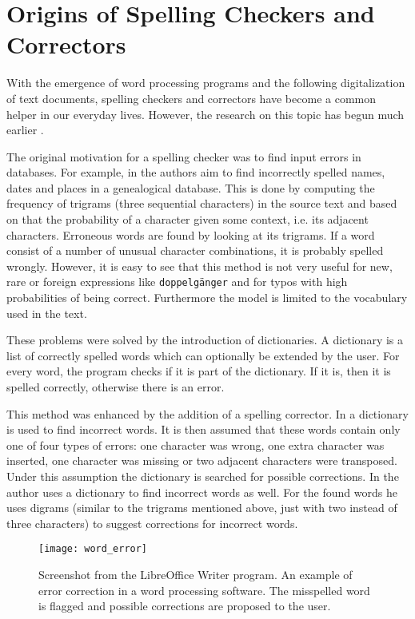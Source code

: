 \section{Origins of Spelling Checkers and Correctors}

With the emergence of word processing programs and the following digitalization of text documents, spelling checkers and correctors have become a common helper in our everyday lives. However, the research on this topic has begun much earlier \cite{program_check_correction}.

The original motivation for a spelling checker was to find input errors in databases. For example, in \cite{data_correction} the authors aim to find incorrectly spelled names, dates and places in a genealogical database. This is done by computing the frequency of trigrams (three sequential characters) in the source text and based on that the probability of a character given some context, i.e. its adjacent characters. Erroneous words are found by looking at its trigrams. If a word consist of a number of unusual character combinations, it is probably spelled wrongly. However, it is easy to see that this method is not very useful for new, rare or foreign expressions like \texttt{doppelg\"{a}nger} and for typos with high probabilities of being correct. Furthermore the model is limited to the vocabulary used in the text.

These problems were solved by the introduction of dictionaries. A dictionary is a list of correctly spelled words which can optionally be extended by the user. For every word, the program checks if it is part of the dictionary. If it is, then it is spelled correctly, otherwise there is an error.

This method was enhanced by the addition of a spelling corrector. In \cite{dictionary_correction} a dictionary is used to find incorrect words. It is then assumed that these words contain only one of four types of errors: one character was wrong, one extra character was inserted, one character was missing or two adjacent characters were transposed. Under this assumption the dictionary is searched for possible corrections. In \cite{digram_correction} the author uses a dictionary to find incorrect words as well. For the found words he uses digrams (similar to the trigrams mentioned above, just with two instead of three characters) to suggest corrections for incorrect words.

\begin{figure}[t]
\centering
\texttt{[image: word\_error]}
\caption{Screenshot from the LibreOffice Writer program. An example of error correction in a word processing software. The misspelled word is flagged and possible corrections are proposed to the user.}
\label{word_correction}
\end{figure}

